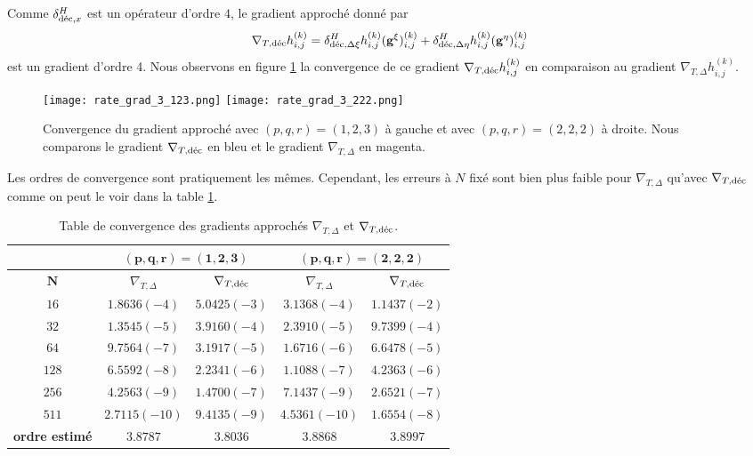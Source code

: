 Comme $\delta^H_{\dec,x}$ est un opérateur d'ordre $4$, le gradient approché donné par 
\begin{equation}
\nabla_{T,\dec} h_{i,j}^{(k)} = \delta^H_{\dec,\Delta \xi} h_{i,j}^{(k)} ( \mathbf{g}^{\xi} )_{i,j}^{(k)} + \delta^H_{\dec,\Delta \eta} h_{i,j}^{(k)} ( \mathbf{g}^{\eta} )_{i,j}^{(k)}
\end{equation}
est un gradient d'ordre 4.
Nous observons en figure \ref{fig:rate_grad3} la convergence de ce gradient $\nabla_{T,\dec} h_{i,j}^{(k)}$ en comparaison au gradient $\nabla_{T,\Delta} h_{i,j}^{(k)}$.
\begin{figure}[htbp]
\begin{center}
\texttt{[image: rate\_grad\_3\_123.png]}
\texttt{[image: rate\_grad\_3\_222.png]}
\end{center}
\caption{Convergence du gradient approché avec $(p,q,r)=(1,2,3)$ à gauche et avec $(p,q,r)=(2,2,2)$ à droite. Nous comparons le gradient $\nabla_{T,\dec}$ en bleu et le gradient $\nabla_{T,\Delta}$ en magenta.}
\label{fig:rate_grad3}
\end{figure}
Les ordres de convergence sont pratiquement les mêmes. Cependant, les erreurs à $N$ fixé sont bien plus faible pour $\nabla_{T,\Delta}$ qu'avec $\nabla_{T,\dec}$ comme on peut le voir dans la table \ref{tab:rate_grad3}.

\begin{table}[htbp]
\begin{center}
\begin{tabular}{|c||c|c||c|c|}
\hline
  & \multicolumn{2}{c||}{$\mathbf{(p,q,r)=(1,2,3)}$} & \multicolumn{2}{c|}{$\mathbf{(p,q,r)=(2,2,2)}$} \\
\hline
$\mathbf{N}$    &  $\nabla_{T,\Delta}$  & $\nabla_{T,\dec}$  &  $\nabla_{T,\Delta}$  & $\nabla_{T,\dec}$     \\
\hline
\hline
$16$   & $1.8636 (-4)$ & $5.0425 (-3)$ & $3.1368 (-4)$ & $1.1437 (-2)$ \\
$32$   & $1.3545 (-5)$ & $3.9160 (-4)$ & $2.3910 (-5)$ & $9.7399 (-4)$ \\
$64$   & $9.7564 (-7)$ & $3.1917 (-5)$ & $1.6716 (-6)$ & $6.6478 (-5)$ \\
$128$  & $6.5592 (-8)$ & $2.2341 (-6)$ & $1.1088 (-7)$ & $4.2363 (-6)$ \\
$256$  & $4.2563 (-9)$ & $1.4700 (-7)$ & $7.1437 (-9)$ & $2.6521 (-7)$ \\
$511$  & $2.7115(-10)$ & $9.4135 (-9)$ & $4.5361(-10)$ & $1.6554 (-8)$ \\
\hline
\hline
\textbf{ordre estimé} & $3.8787$ & $3.8036$ & $3.8868$ & $3.8997$\\
\hline 
\end{tabular}
\end{center}
\caption{Table de convergence des gradients approchés $\nabla_{T,\Delta}$ et $\nabla_{T,\dec}$.}
\label{tab:rate_grad3}
\end{table}














